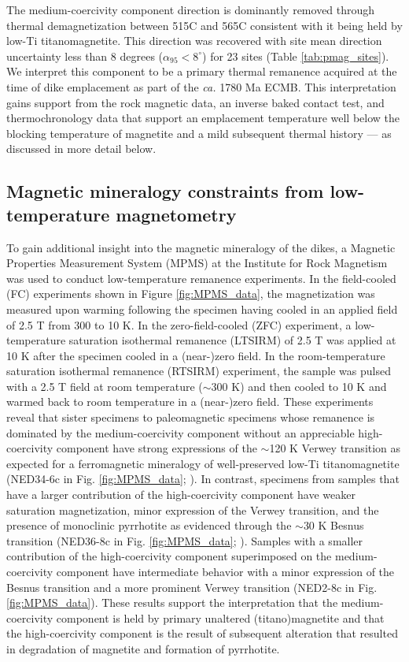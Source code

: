 \documentclass[draft]{agujournal2019}
\begin{document}
The medium-coercivity component direction is dominantly removed through thermal demagnetization between 515\textdegree C and 565\textdegree C consistent with it being held by low-Ti titanomagnetite. This direction was recovered with site mean direction uncertainty less than 8 degrees ($\alpha_{95}<8^{\circ}$) for 23 sites (Table \ref{tab:pmag_sites}). We interpret this component to be a primary thermal remanence acquired at the time of dike emplacement as part of the \textit{ca.} 1780 Ma ECMB. This interpretation gains support from the rock magnetic data, an inverse baked contact test, and thermochronology data that support an emplacement temperature well below the blocking temperature of magnetite and a mild subsequent thermal history --- as discussed in more detail below. 

\subsection{Magnetic mineralogy constraints from low-temperature magnetometry}

To gain additional insight into the magnetic mineralogy of the dikes, a Magnetic Properties Measurement System (MPMS) at the Institute for Rock Magnetism was used to conduct low-temperature remanence experiments. In the field-cooled (FC) experiments shown in Figure \ref{fig:MPMS_data}, the magnetization was measured upon warming following the specimen having cooled in an applied field of 2.5 T from 300 to 10 K. In the zero-field-cooled (ZFC) experiment, a low-temperature saturation isothermal remanence (LTSIRM) of 2.5 T was applied at 10 K after the specimen cooled in a (near-)zero field. In the room-temperature saturation isothermal remanence (RTSIRM) experiment, the sample was pulsed with a 2.5 T field at room temperature ($\sim$300 K) and then cooled to 10 K and warmed back to room temperature in a (near-)zero field. These experiments reveal that sister specimens to paleomagnetic specimens whose remanence is dominated by the medium-coercivity component without an appreciable high-coercivity component have strong expressions of the $\sim$120 K Verwey transition as expected for a ferromagnetic mineralogy of well-preserved low-Ti titanomagnetite (NED34-6c in Fig. \ref{fig:MPMS_data}; ). In contrast, specimens from samples that have a larger contribution of the high-coercivity component have weaker saturation magnetization, minor expression of the Verwey transition, and the presence of monoclinic pyrrhotite as evidenced through the $\sim$30 K Besnus transition (NED36-8c in Fig. \ref{fig:MPMS_data}; ). Samples with a smaller contribution of the high-coercivity component superimposed on the medium-coercivity component have intermediate behavior with a minor expression of the Besnus transition and a more prominent Verwey transition (NED2-8c in Fig. \ref{fig:MPMS_data}). These results support the interpretation that the medium-coercivity component is held by primary unaltered (titano)magnetite and that the high-coercivity component is the result of subsequent alteration that resulted in degradation of magnetite and formation of pyrrhotite.
\end{document}

